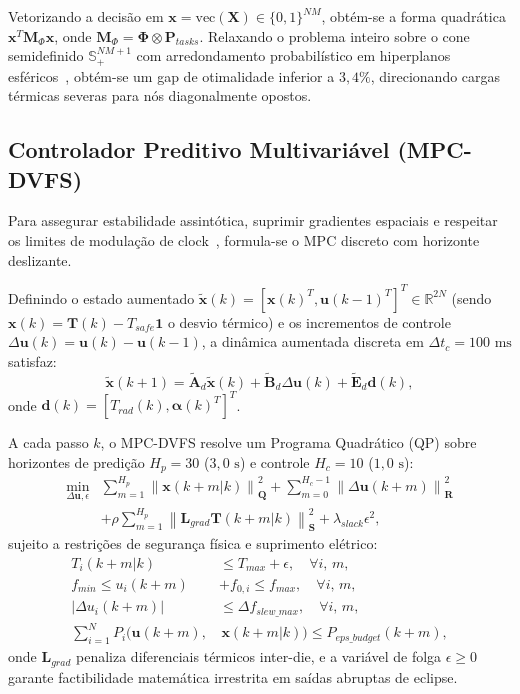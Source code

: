 \documentclass[journal]{IEEEtran}
\begin{document}
Vetorizando a decisão em $\mathbf{x} = \text{vec}(\mathbf{X}) \in \{0, 1\}^{NM}$, obtém-se a forma quadrática $\mathbf{x}^T \mathbf{M}_{\Phi} \mathbf{x}$, onde $\mathbf{M}_{\Phi} = \mathbf{\Phi} \otimes \mathbf{P}_{tasks}$. Relaxando o problema inteiro sobre o cone semidefinido $\mathbb{S}_+^{NM+1}$ com arredondamento probabilístico em hiperplanos esféricos~\cite{boyd2004convex}, obtém-se um gap de otimalidade inferior a $3{,}4\%$, direcionando cargas térmicas severas para nós diagonalmente opostos.

\subsection{Controlador Preditivo Multivariável (MPC-DVFS)}
Para assegurar estabilidade assintótica, suprimir gradientes espaciais e respeitar os limites de modulação de clock~\cite{lesueur2010dvfs, murali2007convex, yuan2025heat, hoffmann2021online}, formula-se o MPC discreto com horizonte deslizante.

Definindo o estado aumentado $\tilde{\mathbf{x}}(k) = [\mathbf{x}(k)^T, \mathbf{u}(k-1)^T]^T \in \mathbb{R}^{2N}$ (sendo $\mathbf{x}(k) = \mathbf{T}(k) - T_{safe} \mathbf{1}$ o desvio térmico) e os incrementos de controle $\Delta \mathbf{u}(k) = \mathbf{u}(k) - \mathbf{u}(k-1)$, a dinâmica aumentada discreta em $\Delta t_c = 100\text{ ms}$ satisfaz:
\begin{equation}
\tilde{\mathbf{x}}(k+1) = \tilde{\mathbf{A}}_d \tilde{\mathbf{x}}(k) + \tilde{\mathbf{B}}_d \Delta \mathbf{u}(k) + \tilde{\mathbf{E}}_d \mathbf{d}(k),
\end{equation}
onde $\mathbf{d}(k) = [T_{rad}(k), \mathbf{\alpha}(k)^T]^T$.

A cada passo $k$, o MPC-DVFS resolve um Programa Quadrático (QP) sobre horizontes de predição $H_p = 30$ ($3{,}0\text{ s}$) e controle $H_c = 10$ ($1{,}0\text{ s}$):
\begin{align}
\min_{\Delta \mathbf{u}, \epsilon} & \sum_{m=1}^{H_p} \left\| \mathbf{x}(k+m|k) \right\|_{\mathbf{Q}}^2 + \sum_{m=0}^{H_c-1} \left\| \Delta \mathbf{u}(k+m) \right\|_{\mathbf{R}}^2 \nonumber \\
& + \rho \sum_{m=1}^{H_p} \left\| \mathbf{L}_{grad} \mathbf{T}(k+m|k) \right\|_{\mathbf{S}}^2 + \lambda_{slack} \epsilon^2,
\end{align}
sujeito a restrições de segurança física e suprimento elétrico:
\begin{align}
T_i(k+m|k) &\le T_{max} + \epsilon, \quad \forall i, \, m, \\
f_{min} \le u_i(k+m) &+ f_{0, i} \le f_{max}, \quad \forall i, \, m, \\
|\Delta u_i(k+m)| &\le \Delta f_{slew\_max}, \quad \forall i, \, m, \\
\sum_{i=1}^N P_i(\mathbf{u}(k+m), &\, \mathbf{x}(k+m|k)) \le P_{eps\_budget}(k+m),
\end{align}
onde $\mathbf{L}_{grad}$ penaliza diferenciais térmicos inter-die, e a variável de folga $\epsilon \ge 0$ garante factibilidade matemática irrestrita em saídas abruptas de eclipse.
\end{document}
